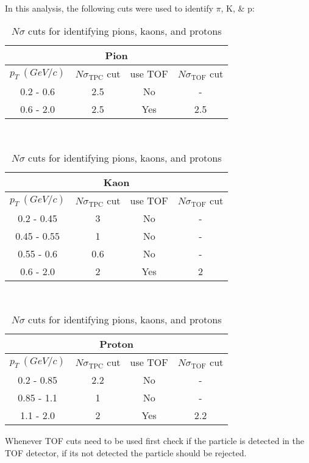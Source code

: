 \documentclass[12pt,a4paper,twoside]{report}
\begin{document}
\\
In this analysis, the following cuts were used to identify $\pi$, K, \& p:\\
\begin{table}[H]
	\centering
	\begin{tabular}{|c|c|c|c|}
		\hline
		\multicolumn{4}{|c|}{Pion} \\
		\hline
		$p_T\ (GeV/c)$ & $N\sigma_\mathrm{TPC}$ cut & use TOF & $N\sigma_\mathrm{TOF}$ cut \\
		\hline
		0.2 - 0.6 & 2.5 & No & - \\
		0.6 - 2.0 & 2.5 & Yes & 2.5 \\
		\hline
	\end{tabular}
\\\vspace*{1cm}
	\begin{tabular}{|c|c|c|c|}
		\hline
		\multicolumn{4}{|c|}{Kaon} \\
		\hline
		$p_T\ (GeV/c)$ & $N\sigma_\mathrm{TPC}$ cut & use TOF & $N\sigma_\mathrm{TOF}$ cut \\
		\hline
		0.2 - 0.45 & 3 & No & - \\
		0.45 - 0.55 & 1 & No & - \\
		0.55 - 0.6 & 0.6 & No & -\\
		0.6 - 2.0 & 2 & Yes & 2 \\
		\hline
	\end{tabular}
\\\vspace*{1cm}
	\begin{tabular}{|c|c|c|c|}
		\hline
		\multicolumn{4}{|c|}{Proton} \\
		\hline
		$p_T\ (GeV/c)$ & $N\sigma_\mathrm{TPC}$ cut & use TOF & $N\sigma_\mathrm{TOF}$ cut \\
		\hline
		0.2 - 0.85 & 2.2 & No & - \\
		0.85 - 1.1 & 1 & No & - \\
		1.1 - 2.0 & 2 & Yes & 2.2 \\
		\hline
	\end{tabular}
\caption{\label{tbl:pidcuts}$N\sigma$ cuts for identifying pions, kaons, and protons}
\end{table}
Whenever TOF cuts need to be used first check if the particle is detected in the TOF detector, if its not detected the particle should be rejected.
\end{document}
